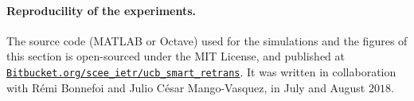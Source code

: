 \paragraph{Reproducility of the experiments.}
%
The source code (MATLAB or Octave) used for the simulations and the figures of this section is open-sourced under the MIT License, and published at \href{https://Bitbucket.org/scee_ietr/ucb_smart_retrans}{\texttt{Bitbucket.org/scee\_ietr/ucb\_smart\_retrans}}.
It was written in collaboration with Rémi Bonnefoi and Julio César Mango-Vasquez, in July and August $2018$.
